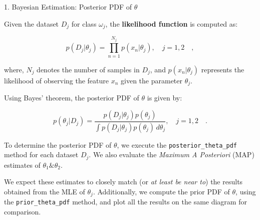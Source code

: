 \documentclass[aspectratio=169,xcolor=dvipsnames]{beamer}
\begin{document}
\begin{frame}{1. Bayesian Estimation: Posterior PDF of $\theta$}

    Given the dataset $D_j$ for class $\omega_j$, the \textbf{likelihood function} is computed as:

    \vspace{-10pt}

    $$ p(D_j|\theta_j) = \prod_{n=1}^{N_j} p(x_n|\theta_j), \quad j = 1, 2 \quad, $$
    
    where, $N_j$ denotes the number of samples in $D_j$, and $p(x_n|\theta_j)$ represents the likelihood of observing the feature $x_n$ given the parameter $\theta_j$.
     
    Using Bayes' theorem, the \alert{posterior PDF} of $\theta$ is given by:  

    \vspace{-10pt}
    
    $$ p(\theta_j|D_j) = \frac{p(D_j|\theta_j) p(\theta_j)}{\int p(D_j|\theta_j) p(\theta_j) \, d\theta_j}, \quad j = 1, 2 \quad. $$

    To determine the posterior PDF of $\theta$, we execute the \texttt{posterior\_theta\_pdf} method for each dataset $D_j$. We also evaluate the \textit{Maximum A Posteriori} (MAP) estimates of $\theta_1 \& \theta_2$. 

    \vspace{5pt}

    We expect these estimates to closely match (or \textit{at least be near to}) the results obtained from the MLE of $\theta_j$. Additionally, we compute the prior PDF of $\theta$, using the \texttt{prior\_theta\_pdf} method, and plot all the results on the same diagram for comparison.


\end{frame}

\end{document}
